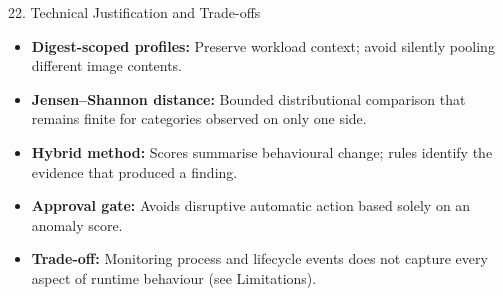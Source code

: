 \documentclass[aspectratio=169,10pt]{beamer}
\begin{document}
\begin{frame}{22. Technical Justification and Trade-offs}
\begin{itemize}
  \item \textbf{Digest-scoped profiles:} Preserve workload context; avoid silently pooling different image contents.
  \item \textbf{Jensen--Shannon distance:} Bounded distributional comparison that remains finite for categories observed on only one side.
  \item \textbf{Hybrid method:} Scores summarise behavioural change; rules identify the evidence that produced a finding.
  \item \textbf{Approval gate:} Avoids disruptive automatic action based solely on an anomaly score.
  \item \textbf{Trade-off:} Monitoring process and lifecycle events does not capture every aspect of runtime behaviour (see Limitations).
\end{itemize}
\end{frame}
\end{document}
